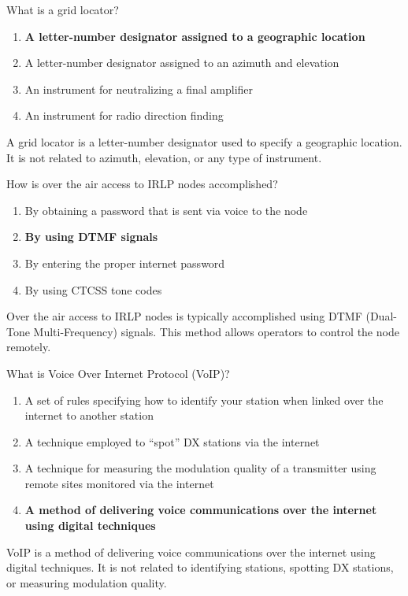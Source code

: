 
\begin{tcolorbox}[colback=gray!10!white,colframe=black!75!black,title={T8C05}]
    What is a grid locator?
    \begin{enumerate}[label=\Alph*,noitemsep]
        \item \textbf{A letter-number designator assigned to a geographic location}
        \item A letter-number designator assigned to an azimuth and elevation
        \item An instrument for neutralizing a final amplifier
        \item An instrument for radio direction finding
    \end{enumerate}
\end{tcolorbox}
A grid locator is a letter-number designator used to specify a geographic location. It is not related to azimuth, elevation, or any type of instrument.


\begin{tcolorbox}[colback=gray!10!white,colframe=black!75!black,title={T8C06}]
    How is over the air access to IRLP nodes accomplished?
    \begin{enumerate}[label=\Alph*,noitemsep]
        \item By obtaining a password that is sent via voice to the node
        \item \textbf{By using DTMF signals}
        \item By entering the proper internet password
        \item By using CTCSS tone codes
    \end{enumerate}
\end{tcolorbox}
Over the air access to IRLP nodes is typically accomplished using DTMF (Dual-Tone Multi-Frequency) signals. This method allows operators to control the node remotely.


\begin{tcolorbox}[colback=gray!10!white,colframe=black!75!black,title={T8C07}]
    What is Voice Over Internet Protocol (VoIP)?
    \begin{enumerate}[label=\Alph*,noitemsep]
        \item A set of rules specifying how to identify your station when linked over the internet to another station
        \item A technique employed to “spot” DX stations via the internet
        \item A technique for measuring the modulation quality of a transmitter using remote sites monitored via the internet
        \item \textbf{A method of delivering voice communications over the internet using digital techniques}
    \end{enumerate}
\end{tcolorbox}
VoIP is a method of delivering voice communications over the internet using digital techniques. It is not related to identifying stations, spotting DX stations, or measuring modulation quality.

